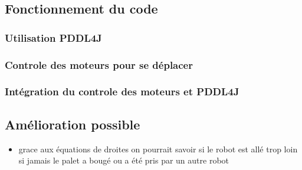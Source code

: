 \documentclass[11pt]{article}
\begin{document}
\subsection{Fonctionnement du code}
\label{sec:org365a186}

\subsubsection{Utilisation PDDL4J}
\label{sec:orge6a3802}

\subsubsection{Controle des moteurs pour se déplacer}
\label{sec:org1b6b06f}

\subsubsection{Intégration du controle des moteurs et PDDL4J}
\label{sec:orge344335}



\subsection{Amélioration possible}
\label{sec:orgd259dcf}

\begin{itemize}
\item grace aux équations de droites on pourrait savoir si le robot est allé trop loin si jamais le palet a bougé ou a été pris par un autre robot
\end{itemize}
\end{document}
